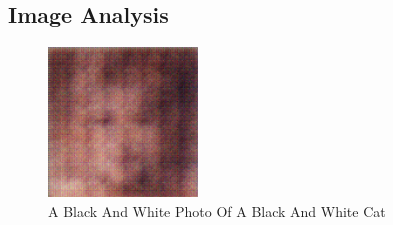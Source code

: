 \documentclass{article}%
\begin{document}
%
\subsection{Image Analysis}%
\label{subsec:ImageAnalysis}%


\begin{figure}[h!]%
\centering%
\includegraphics[width=150px]{500_fake_images/samples_5_278.png}%
\caption{A Black And White Photo Of A Black And White Cat}%
\end{figure}

%
\end{document}
